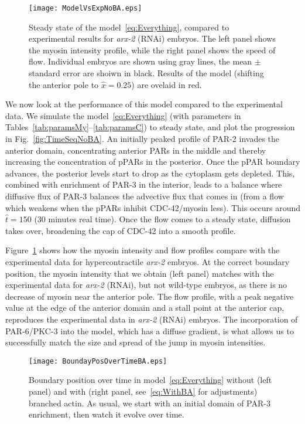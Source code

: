\documentclass[11pt]{article}
\newcommand{\6}[1]{#1_{\text{6}}}
\newcommand{\3}[1]{#1_{\text{3}}}
\begin{document}
\begin{figure}
\centering
\texttt{[image: ModelVsExpNoBA.eps]}
\caption{\label{fig:StStNoBA}Steady state of the model\ \eqref{eq:Everything}, compared to experimental results for \emph{arx-2} (RNAi) embryos. The left panel shows the myosin intensity profile, while the right panel shows the speed of flow. Individual embryos are shown using gray lines, the mean $\pm$ standard error are shoiwn in black. Results of the model (shifting the anterior pole to $\hat x = 0.25$) are ovelaid in red.}
\end{figure}

We now look at the performance of this model compared to the experimental data. We simulate the model\ \eqref{eq:Everything} (with parameters in Tables\ \ref{tab:paramsMy}--\ref{tab:paramsC}) to steady state, and plot the progression in Fig.\ \ref{fig:TimeSeqNoBA}. An initially peaked profile of PAR-2 invades the anterior domain, concentrating anterior PARs in the middle and thereby increasing the concentration of pPARs in the posterior. Once the pPAR boundary advances, the posterior levels start to drop as the cytoplasm gets depleted. This, combined with enrichment of PAR-3 in the interior, leads to a balance where diffusive flux of PAR-3 balances the advective flux that comes in (from a flow which weakens when the pPARs inhibit CDC-42/myosin less). This occurs around $\hat t = 150$ (30 minutes real time). Once the flow comes to a steady state, diffusion takes over, broadening the cap of CDC-42 into a smooth profile.

Figure\ \ref{fig:StStNoBA} shows how the myosin intensity and flow profiles compare with the experimental data for hypercontractile \emph{arx-2} embryos. At the correct boundary position, the myosin intensity that we obtain (left panel) matches with the experimental data for \emph{arx-2} (RNAi), but not wild-type embryos, as there is no decrease of myosin near the anterior pole. The flow profile, with a peak negative value at the edge of the anterior domain and a stall point at the anterior cap, reproduces the experimental data in \emph{arx-2} (RNAi) embryos. The incorporation of PAR-6/PKC-3 into the model, which has a diffuse gradient, is what allows us to successfully match the size and spread of the jump in myosin intensities.

\begin{figure}
\centering
\texttt{[image: BoundayPosOverTimeBA.eps]}
\caption{\label{fig:BPosBA}Boundary position over time in model\ \eqref{eq:Everything} without (left panel) and with (right panel, see\ \eqref{eq:WithBA} for adjustments) branched actin. As usual, we start with an initial domain of PAR-3 enrichment, then watch it evolve over time. }
\end{figure}
\end{document}

